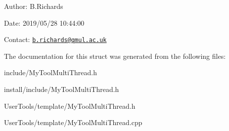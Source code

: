 \begin{DoxyParagraph}{Author\-:}
B.\-Richards 
\end{DoxyParagraph}
\begin{DoxyParagraph}{Date\-:}
2019/05/28 10\-:44\-:00 
\end{DoxyParagraph}
Contact\-: \href{mailto:b.richards@qmul.ac.uk}{\tt b.\-richards@qmul.\-ac.\-uk} 

The documentation for this struct was generated from the following files\-:\begin{DoxyCompactItemize}
\item 
include/My\-Tool\-Multi\-Thread.\-h\item 
install/include/My\-Tool\-Multi\-Thread.\-h\item 
User\-Tools/template/My\-Tool\-Multi\-Thread.\-h\item 
User\-Tools/template/My\-Tool\-Multi\-Thread.\-cpp\end{DoxyCompactItemize}
